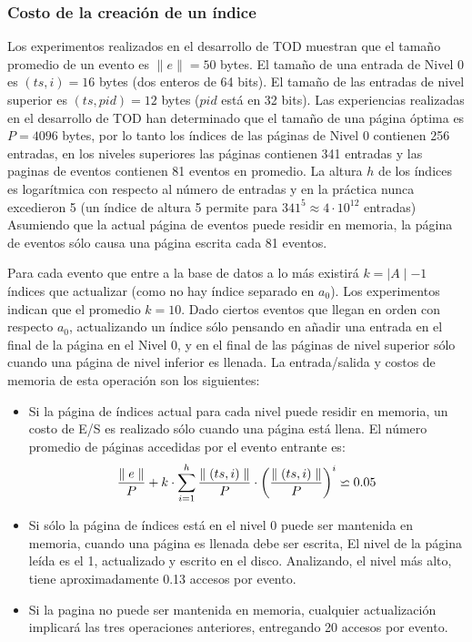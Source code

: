 \documentclass[12pt,legalpaper]{report}
\begin{document}
			\subsubsection{Costo de la creación de un índice}

Los experimentos realizados en el desarrollo de TOD muestran que el tamaño promedio de un evento es $\parallel e \parallel= 50$ bytes.  El tamaño de una entrada de Nivel 0 es $(ts,i) = 16$ bytes (dos enteros de 64 bits).  El tamaño de las entradas de nivel superior es $(ts,pid) = 12$ bytes ($pid$ está en 32 bits).  Las experiencias realizadas en el desarrollo de TOD han determinado que el tamaño de una página óptima es $P = 4096$ bytes, por lo tanto los índices de las páginas de Nivel 0 contienen 256 entradas, en los niveles superiores las páginas contienen 341 entradas y las paginas de eventos contienen 81 eventos en promedio.  La altura $h$ de los índices es logarítmica con respecto al número de entradas y en la práctica nunca excedieron 5 (un índice de altura 5 permite para $341^{5} \approx 4\cdot10^{12}$ entradas)  Asumiendo que la actual página de eventos puede residir en memoria, la página de eventos sólo causa una página escrita cada 81 eventos.

Para cada evento que entre a la base de datos a lo más existirá $k = \mid A\mid-1$ índices que actualizar (como no hay índice separado en $a_{0}$).  Los experimentos indican que el promedio $k = 10$.  Dado ciertos eventos que llegan en orden con respecto $a_{0}$, actualizando un índice sólo pensando en añadir una entrada en el final de la página en el Nivel 0, y en el final de las páginas de nivel superior sólo cuando una página de nivel inferior es llenada.  La entrada/salida y costos de memoria de esta operación son los siguientes:

\begin{itemize}
	\item Si la página de índices actual para cada nivel puede residir en memoria, un costo de E/S es realizado sólo cuando una página está llena.  El número promedio de páginas accedidas por el evento entrante es:
		\begin{displaymath}
{\parallel e \parallel \over P} + k \cdot \sum_{i=1}^{h}{\parallel(ts,i)\parallel \over P}\cdot \left({\parallel(ts,i)\parallel \over P}\right)^i\backsimeq 0.05
		\end{displaymath}

	\item Si sólo la página de índices está en el nivel 0 puede ser mantenida en memoria, cuando una página es llenada debe ser escrita, El nivel de la página leída es el 1, actualizado y escrito en el disco.  Analizando, el nivel más alto, tiene aproximadamente 0.13 accesos por evento.  

	\item Si la pagina no puede ser mantenida en memoria, cualquier actualización implicará las tres operaciones anteriores, entregando 20 accesos por evento.
\end{itemize}
\end{document}
